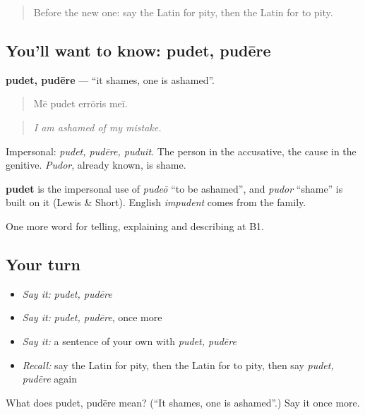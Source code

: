 \begin{quote}
Before the new one: say the Latin for pity, then the Latin for to pity.
\end{quote}

\subsection*{You'll want to know: pudet, pudēre}
\textbf{pudet, pudēre} — \textquotedblleft{}it shames, one is ashamed\textquotedblright{}.

\begin{quote}
Mē pudet errōris meī.
\end{quote}

\begin{quote}
\emph{I am ashamed of my mistake.}
\end{quote}

Impersonal: \emph{pudet, pudēre, puduit}. The person in the accusative, the cause in the genitive. \emph{Pudor}, already known, is shame.

\begin{cousinweb}
\textbf{pudet} is the impersonal use of \emph{pudeō} \textquotedblleft{}to be ashamed\textquotedblright{}, and \emph{pudor} \textquotedblleft{}shame\textquotedblright{} is built on it (Lewis \& Short). English \emph{impudent} comes from the family.
\end{cousinweb}

\begin{grammarlens}[title={What you've built}]
One more word for telling, explaining and describing at B1.
\end{grammarlens}

\subsection*{Your turn}
\begin{itemize}
\raggedright
  \item \emph{Say it:} \emph{pudet, pudēre}
  \item \emph{Say it:} \emph{pudet, pudēre}, once more
  \item \emph{Say it:} a sentence of your own with \emph{pudet, pudēre}
  \item \emph{Recall:} say the Latin for pity, then the Latin for to pity, then say \emph{pudet, pudēre} again
\end{itemize}

\begin{tcolorbox}[breakable,colback=teal!4,colframe=teal!35!black,title={Before you move on}]
What does pudet, pudēre mean? (\textquotedblleft{}It shames, one is ashamed\textquotedblright{}.) Say it once more.
\end{tcolorbox}
